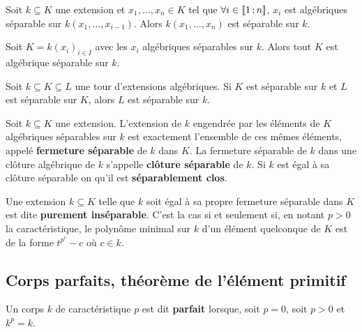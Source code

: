 	\begin{pop}
		Soit $k \subseteq K$ une extension et $x_1,\ldots,x_n \in K$ tel que $\forall i \in \mathopen{[\![}1\mathclose{}\mathpunct{};n\mathclose{]\!]}$, $x_i$ est algébriques séparable sur $k(x_1,\ldots,x_{i - 1})$.
		Alors $k(x_1,\ldots,x_n)$ est séparable sur $k$.
	\end{pop}
	
	\begin{cor}
		Soit $K = k(x_i)_{i \in I}$ avec les $x_i$ algébriques séparables sur $k$.
		Alors tout $K$ est algébrique séparable sur $k$.
	\end{cor}
	
	\begin{cor}
		Soit $k \subseteq K \subseteq L$ une tour d'extensions algébriques.
		Si $K$ est séparable sur $k$ et $L$ est séparable sur $K$, alors $L$ est séparable sur $k$.
	\end{cor}
	
	\begin{rem}
		Soit $k	\subseteq K$ une extension.
		L'extension de $k$ engendrée par les éléments de $K$ algébriques séparables sur $k$ est exactement l'ensemble de ces mêmes éléments, appelé \textbf{fermeture séparable} de $k$ dans $K$.
		La fermeture séparable de $k$ dans une clôture algébrique de $k$ s'appelle \textbf{clôture séparable} de $k$.
		Si $k$ est égal à sa clôture séparable on qu'il est \textbf{séparablement clos}.
	\end{rem}
	
	\begin{rem}
		Une extension $k \subseteq K$ telle que $k$ soit égal à sa propre fermeture séparable dans $K$ est dite \textbf{purement inséparable}.
		C'est la cas si et seulement si, en notant $p > 0$ la caractéristique, le polynôme minimal sur $k$ d'un élément quelconque de $K$ est de la forme $t^{p^e} - c$ où $c \in k$.
	\end{rem}
	


\subsection{Corps parfaits, théorème de l'élément primitif}

	\begin{defn}
		Un corps $k$ de caractéristique $p$ est dit \textbf{parfait} lorsque, soit $p = 0$, soit $p > 0$ et $k^p = k$.
	\end{defn}
	
